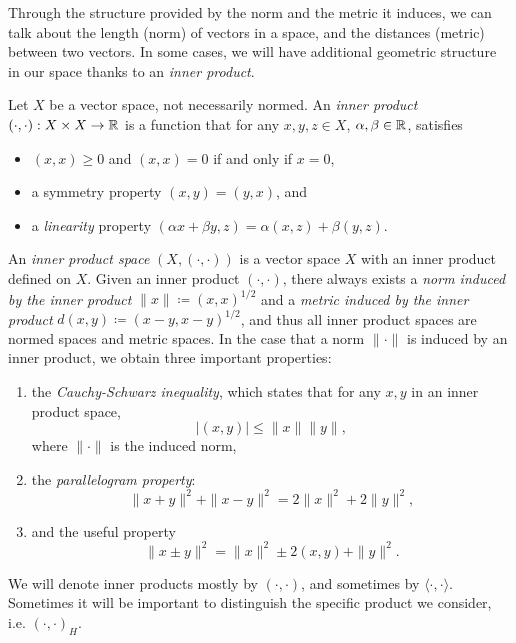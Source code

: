 Through the structure provided by the norm and the metric it induces, we can talk about the length (norm) of vectors in a space, and the distances (metric) between two vectors. In some cases, we will have additional geometric structure in our space thanks to an \emph{inner product}. 
\begin{definition}
    Let $X$ be a vector space, not necessarily normed. An \emph{inner product} $(\cdot,\cdot):X\times X\to \mathbb{R}$ is a function that for any $x,y,z\in X$, $\alpha, \beta\in\mathbb{R}$, satisfies
    \begin{itemize}
        \item $(x,x)\geq 0$ and $(x,x)=0$ if and only if $x=0$, 
        \item a symmetry property $(x,y)=(y,x)$, and
        \item a \emph{linearity} property $(\alpha x+\beta y, z)=\alpha(x,z)+\beta(y,z)$.
    \end{itemize}
    An \emph{inner product space} $(X,(\cdot,\cdot))$ is a vector space $X$ with an inner product defined on $X$. Given an inner product $(\cdot,\cdot)$, there always exists a \emph{norm induced by the inner product} $\|x\|\coloneqq (x,x)^{1/2}$ and a \emph{metric induced by the inner product} $d(x,y)\coloneqq (x-y, x-y)^{1/2}$, and thus all inner product spaces are normed spaces and metric spaces. In the case that a norm $\|\cdot\|$ is induced by an inner product, we obtain three important properties: 
    \begin{enumerate}
        \item the \emph{Cauchy-Schwarz inequality}, which states that for any $x,y$ in an inner product space, 
            \begin{equation}
                |(x, y)| \leq \|x\| \|y\|,
            \end{equation}
            where $\|\cdot\|$ is the induced norm,
        \item the \emph{parallelogram property}:
            \begin{equation}
                \|x+y\|^2 + \|x-y\|^2 = 2\|x\|^2 + 2\|y\|^2,
            \end{equation}
        \item and the useful property 
            \begin{equation}
                \|x\pm y\|^2 = \|x\|^2 \pm 2(x,y) + \|y\|^2.
            \end{equation}
    \end{enumerate}
    We will denote inner products mostly by $(\cdot, \cdot)$, and sometimes by $\langle\cdot, \cdot\rangle$. Sometimes it will be important to distinguish the specific product we consider, i.e. $(\cdot, \cdot)_H$. 
\end{definition}

